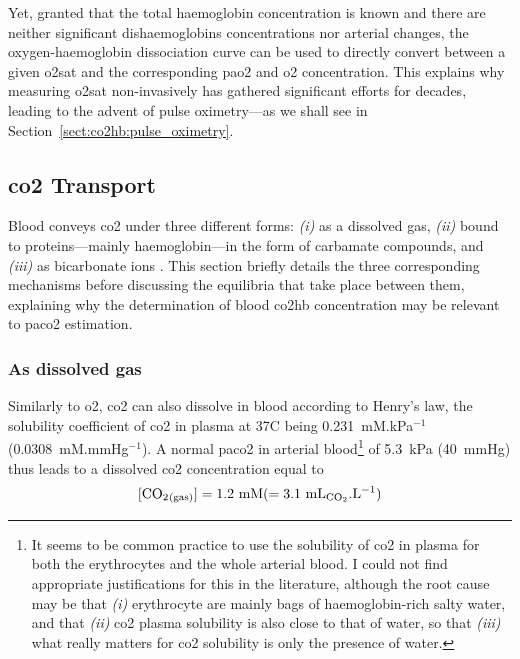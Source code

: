 Yet, granted that the total haemoglobin concentration is known and there are neither significant dishaemoglobins concentrations nor arterial \pH{} changes, the oxygen-haemoglobin dissociation curve can be used to directly convert between a given \gls{o2sat} and the corresponding \gls{pao2} and \gls{o2} concentration\cite[Chap.~11]{nunns}. This explains why measuring \gls{o2sat} non-invasively has gathered significant efforts for decades, leading to the advent of pulse oximetry---as we shall see in Section~\ref{sect:co2hb:pulse_oximetry}.

\subsection{\texorpdfstring{\gls{co2}}{CO2} Transport}\label{subsect:co2hb:co2_transport}

Blood conveys \gls{co2} under three different forms: \textit{(i)} as a dissolved gas, \textit{(ii)} bound to proteins---mainly haemoglobin---in the form of carbamate compounds, and \textit{(iii)} as bicarbonate ions . This section briefly details the three corresponding mechanisms before discussing the equilibria that take place between them, explaining why the determination of blood \gls{co2hb} concentration may be relevant to \gls{paco2} estimation.


\subsubsection{As dissolved gas}

Similarly to \gls{o2}, \gls{co2} can also dissolve in blood according to Henry's law, the solubility coefficient of \gls{co2} in plasma at 37{\degree}C being 0.231~mM.kPa$^{-1}$ (0.0308~mM.mmHg$^{-1}$)\cite[Table~10.1]{nunns}. A normal \gls{paco2} in arterial blood\footnote{It seems to be common practice to use the solubility of \gls{co2} in plasma for both the erythrocytes and the whole arterial blood\cite{geers2000}. I could not find appropriate justifications for this in the literature, although the root cause may be that \textit{(i)} erythrocyte are mainly bags of haemoglobin-rich salty water, and that \textit{(ii)} \gls{co2} plasma solubility is also close to that of water, so that \textit{(iii)} what really matters for \gls{co2} solubility is only the presence of water.} of 5.3~kPa (40~mmHg) thus leads to a dissolved \gls{co2} concentration equal to
\begin{equation}
	\ce{[CO2_{(gas)}]}=1.2\text{~mM} (= 3.1\text{~mL$_{\ce{CO2}}$.L$^{-1}$})
\end{equation}

